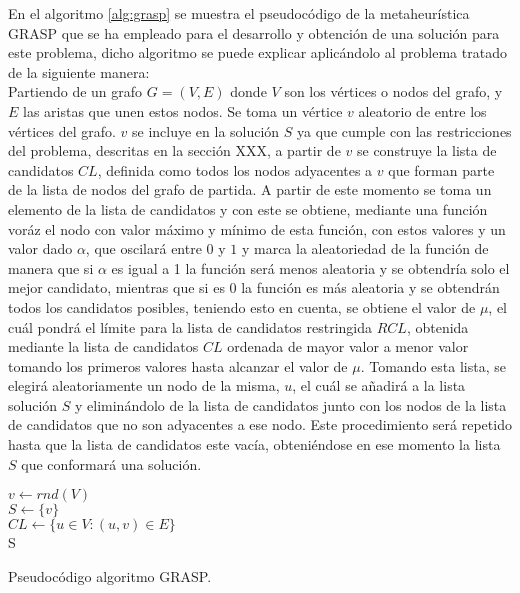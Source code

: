 En el algoritmo \ref{alg:grasp} se muestra el pseudocódigo de la metaheurística GRASP que se ha empleado para el desarrollo y obtención de una solución para este problema, dicho algoritmo se puede explicar aplicándolo al problema tratado de la siguiente manera:\\
Partiendo de un grafo $G=(V, E)$ donde $V$ son los vértices o nodos del grafo, y $E$ las aristas que unen estos nodos. Se toma un vértice $v$ aleatorio de entre los vértices del grafo. $v$ se incluye en la solución $S$ ya que cumple con las restricciones del problema, descritas en la sección XXX, a partir de $v$ se construye la lista de candidatos $CL$, definida como todos los nodos adyacentes a $v$ que forman parte de la lista de nodos del grafo de partida. A partir de este momento se toma un elemento de la lista de candidatos y con este se obtiene, mediante una función voráz el nodo con valor máximo y mínimo de esta función, con estos valores y un valor dado $\alpha$, que oscilará entre $0$ y $1$ y marca la aleatoriedad de la función de manera que si $\alpha$ es igual a 1 la función será menos aleatoria y se obtendría solo el mejor candidato, mientras que si es 0 la función es más aleatoria y se obtendrán todos los candidatos posibles, teniendo esto en cuenta, se obtiene el valor de $\mu$, el cuál pondrá el límite para la lista de candidatos restringida $RCL$, obtenida mediante la lista de candidatos $CL$ ordenada de mayor valor a menor valor tomando los primeros valores hasta alcanzar el valor de $\mu$. Tomando esta lista, se elegirá aleatoriamente un nodo de la misma, $u$, el cuál se añadirá a la lista solución $S$ y eliminándolo de la lista de candidatos junto con los nodos de la lista de candidatos que no son adyacentes a ese nodo. Este procedimiento será repetido hasta que la lista de candidatos este vacía, obteniéndose en ese momento la lista $S$ que conformará una solución.

\begin{algorithm}
	\SetAlgoLined
	$ v \gets rnd( V ) $ \\[0.2cm]
	$ S \gets \{ v \} $ \\[0.2cm]
	$ CL \gets \{u \in V : (u, v) \in E\} $ \\[0.2cm]
	\Return S
	\caption{Pseudocódigo algoritmo GRASP.}
	\label{alg:grasp}
\end{algorithm}

